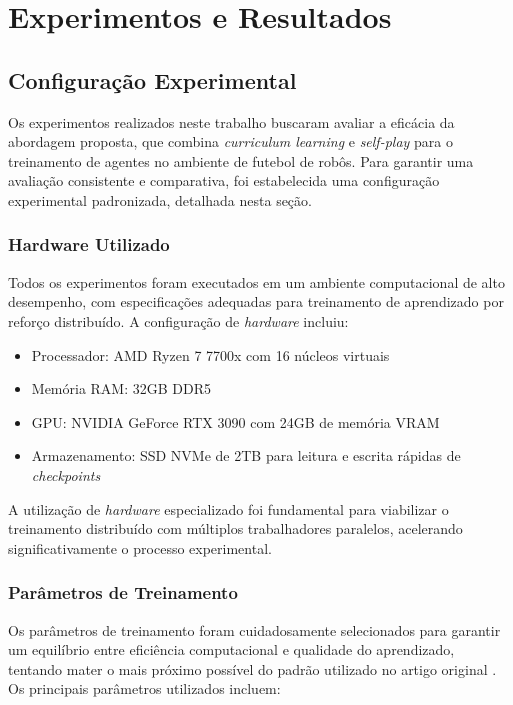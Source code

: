 \chapter{Experimentos e Resultados}
\label{cap:resultados}



\section{Configuração Experimental}
\label{sec:configuracao_experimental}

Os experimentos realizados neste trabalho buscaram avaliar a eficácia da abordagem proposta, que combina \textit{curriculum learning} e \textit{self-play} para o treinamento de agentes no ambiente de futebol de robôs. Para garantir uma avaliação consistente e comparativa, foi estabelecida uma configuração experimental padronizada, detalhada nesta seção.

\subsection{Hardware Utilizado}

Todos os experimentos foram executados em um ambiente computacional de alto desempenho, com especificações adequadas para treinamento de aprendizado por reforço distribuído. A configuração de \textit{hardware} incluiu:

\begin{itemize}
    \item Processador: AMD Ryzen 7 7700x com 16 núcleos virtuais
    \item Memória RAM: 32GB DDR5
    \item GPU: NVIDIA GeForce RTX 3090 com 24GB de memória VRAM
    \item Armazenamento: SSD NVMe de 2TB para leitura e escrita rápidas de \textit{checkpoints}
\end{itemize}

A utilização de \textit{hardware} especializado foi fundamental para viabilizar o treinamento distribuído com múltiplos trabalhadores paralelos, acelerando significativamente o processo experimental.

\subsection{Parâmetros de Treinamento}

Os parâmetros de treinamento foram cuidadosamente selecionados para garantir um equilíbrio entre eficiência computacional e qualidade do aprendizado, tentando mater o mais próximo possível do padrão utilizado no artigo original \cite{bruno_brandao}. Os principais parâmetros utilizados incluem:

